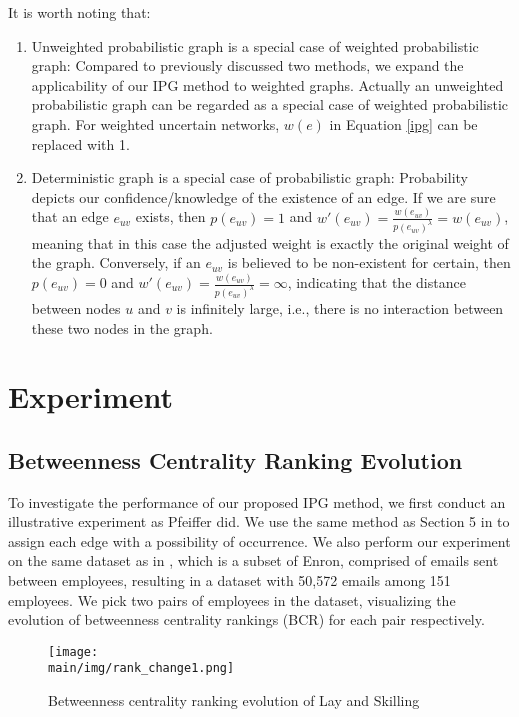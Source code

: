 \documentclass[\main/thesis.tex]{subfiles}
\begin{document}
It is worth noting that:
\begin{enumerate}
\item Unweighted probabilistic graph is a special case of weighted probabilistic graph: Compared to previously discussed two methods, we expand the applicability of our IPG method to weighted graphs. Actually an unweighted probabilistic graph can be regarded as a special case of weighted probabilistic graph. For weighted uncertain networks, $w(e)$ in Equation \ref{ipg} can be replaced with 1.
\item Deterministic graph is a special case of probabilistic graph: Probability depicts our confidence/knowledge of the existence of an edge. If we are sure that an edge $e_{uv}$ exists, then $p(e_{uv}) = 1$ and $w'(e_{uv}) = \frac{w(e_{uv})}{p(e_{uv})^\lambda } = w(e_{uv})$, meaning that in this case the adjusted weight is exactly the original weight of the graph. Conversely, if an $e_{uv}$ is believed to be non-existent for certain, then $p(e_{uv}) = 0$ and $w'(e_{uv}) = \frac{w(e_{uv})}{p(e_{uv})^\lambda } = \infty$, indicating that the distance between nodes $u$ and $v$ is infinitely large, i.e., there is no interaction between these two nodes in the graph.
\end{enumerate}

\section{Experiment}
\subsection{Betweenness Centrality Ranking Evolution}
To investigate the performance of our proposed IPG method, we first conduct an illustrative experiment as Pfeiffer \cite{pfeiffer2010probabilistic,pfeiffer2011methods} did. We use the same method as Section 5 in \cite{pfeiffer2010probabilistic} to assign each edge with a possibility of occurrence. We also perform our experiment on the same dataset as in \cite{pfeiffer2010probabilistic,pfeiffer2011methods}, which is a subset of Enron, comprised of emails sent between employees, resulting in a dataset with 50,572 emails among 151 employees. We pick two pairs of employees in the dataset, visualizing the evolution of betweenness centrality rankings (BCR) for each pair respectively. 
\begin{figure}
\centering
\texttt{[image: \\main/img/rank\_change1.png]}
\caption{Betweenness centrality ranking evolution of Lay and Skilling}
\label{rank_change1}
\end{figure}
\end{document}

